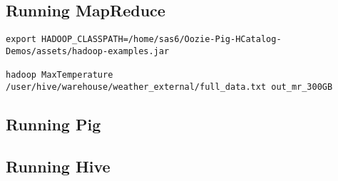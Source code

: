 \subsection{Running MapReduce}




\begin{lstlisting}[linewidth=\columnwidth,breaklines=true]
export HADOOP_CLASSPATH=/home/sas6/Oozie-Pig-HCatalog-Demos/assets/hadoop-examples.jar

hadoop MaxTemperature /user/hive/warehouse/weather_external/full_data.txt out_mr_300GB
\end{lstlisting}

\subsection{Running Pig}

\subsection{Running Hive}